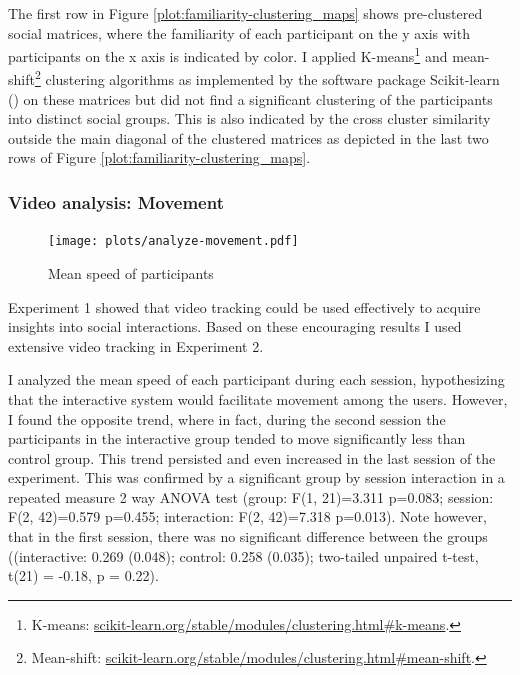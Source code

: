 \documentclass[a4paper,11pt]{article}
\begin{document}
{The first row in Figure \ref{plot:familiarity-clustering_maps} shows pre-clustered social matrices, where the familiarity of each participant on the y axis with participants on the x axis is indicated by color.
I applied K-means\footnote{K-means: \href{http://scikit-learn.org/stable/modules/clustering.html\#k-means}{scikit-learn.org/stable/modules/clustering.html\#k-means}.} and mean-shift\footnote{Mean-shift: \href{http://scikit-learn.org/stable/modules/clustering.html\#mean-shift}{scikit-learn.org/stable/modules/clustering.html\#mean-shift}.} clustering algorithms as implemented by the software package Scikit-learn (\cite{scikit-learn}) on these matrices but did not find a significant clustering of the participants into distinct social groups.
This is also indicated by the cross cluster similarity outside the main diagonal of the clustered matrices as depicted in the last two rows of Figure \ref{plot:familiarity-clustering_maps}.

\subsubsection{Video analysis: Movement}

\begin{figure}[!htb]
    \centering
    \texttt{[image: plots/analyze-movement.pdf]}
    \caption{Mean speed of participants}\label{plot:analyze-movement}
\end{figure}

Experiment 1 showed that video tracking could be used effectively to acquire insights into social interactions.
Based on these encouraging results I used extensive video tracking in Experiment 2.

I analyzed the mean speed of each participant during each session, hypothesizing that the interactive system would facilitate movement among the users.
However, I found the opposite trend, where in fact, during the second session the participants in the interactive group tended to move significantly less than control group.
This trend persisted and even increased in the last session of the experiment.
This was confirmed by a significant group by session interaction in a repeated measure 2 way ANOVA test (group: F(1, 21)=3.311 p=0.083; session: F(2, 42)=0.579 p=0.455; interaction: F(2, 42)=7.318 p=0.013).
Note however, that in the first session, there was no significant difference between the groups ((interactive: 0.269 (0.048); control: 0.258 (0.035); two-tailed unpaired t-test, t(21) = -0.18, p = 0.22).

}
\end{document}
